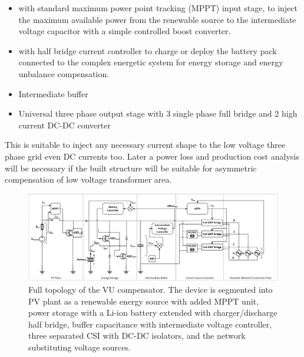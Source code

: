         \begin{itemize}

            \item {} with standard maximum power point tracking (MPPT) input stage, to inject the maximum available power from the renewable source to the intermediate voltage capacitor with a simple controlled boost converter.
            \item {} with half bridge current controller to charge or deploy the battery pack connected to the complex energetic system for energy storage and energy unbalance compensation.
            \item Intermediate buffer 
            \item Universal three phase output stage with 3 single phase full bridge  and 2 high current DC-DC converter
        \end{itemize}

    This is suitable to inject any necessary current shape to the low voltage three phase grid even DC currents too. Later a power loss and production cost analysis will be necessary if the built structure will be suitable for asymmetric compensation of low voltage transformer area.
    \newpage

        \begin{figure}[!h]
        \centering
        \includegraphics[width=1.0\textwidth,angle=-90]{Unblance_EPS_Pics/PowerTopology_full.png}
        \caption{Full topology of the VU compensator. The device is segmented into PV plant as a renewable energy source with added MPPT unit, power storage with a Li-ion battery extended with charger/discharge half bridge, buffer capacitance with intermediate voltage controller, three separated CSI with DC-DC isolators, and the network substituting voltage sources.}
        \label{fig:inv}
        \end{figure}

